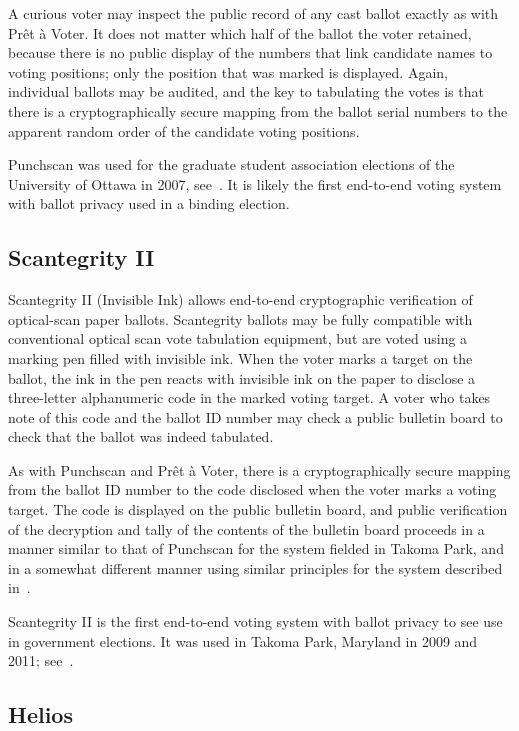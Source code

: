 A curious voter may inspect the public record of any cast ballot
exactly as with Prêt à Voter. It does not matter which half of the
ballot the voter retained, because there is no public display of the
numbers that link candidate names to voting positions; only the
position that was marked is displayed.  Again, individual ballots may
be audited, and the key to tabulating the votes is that there is a
cryptographically secure mapping from the ballot serial numbers to the
apparent random order of the candidate voting positions.

Punchscan was used for the graduate student association elections of
the University of Ottawa in 2007, see~\cite{essex2007}. It is likely
the first end-to-end voting system with ballot privacy used in a
binding election.

\subsection{Scantegrity II~\cite{chaum2008,chaum2009}}

Scantegrity II (Invisible Ink) allows end-to-end cryptographic
verification of optical-scan paper ballots.  Scantegrity ballots may
be fully compatible with conventional optical scan vote tabulation
equipment, but are voted using a marking pen filled with invisible
ink.  When the voter marks a target on the ballot, the ink in the pen
reacts with invisible ink on the paper to disclose a three-letter
alphanumeric code in the marked voting target.  A voter who takes note
of this code and the ballot ID number may check a public bulletin
board to check that the ballot was indeed tabulated.

As with Punchscan and Prêt à Voter, there is a cryptographically
secure mapping from the ballot ID number to the code disclosed when
the voter marks a voting target.  The code is displayed on the public
bulletin board, and public verification of the decryption and tally of
the contents of the bulletin board proceeds in a manner similar to
that of Punchscan for the system fielded in Takoma Park, and in a
somewhat different manner using similar principles for the system
described in~\cite{chaum2009}.

Scantegrity II is the first end-to-end voting system with ballot
privacy to see use in government elections.  It was used in Takoma
Park, Maryland in 2009 and 2011; see~\cite{carback2010}.

\subsection{Helios~\cite{adida2008,adida2009}}


